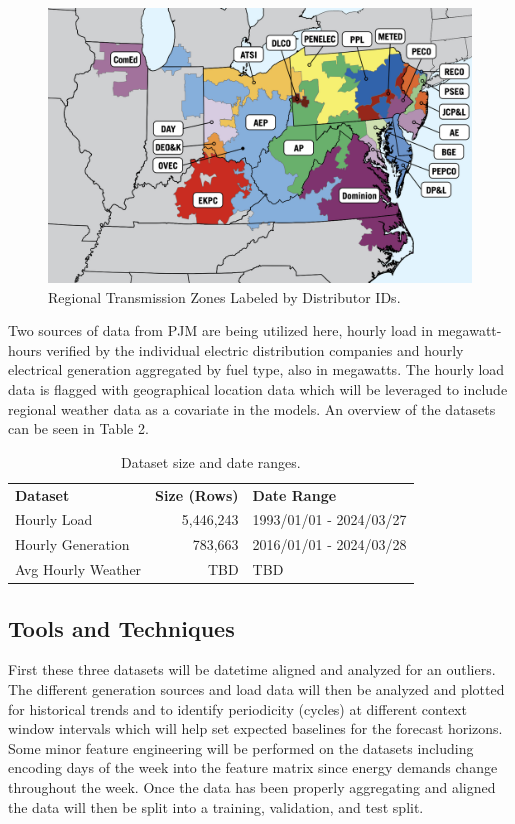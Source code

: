 \documentclass[sigconf]{acmart}
\begin{document}
  \begin{figure}[hbt!]
    \includegraphics[width=\columnwidth]{Images/Zones.png}
    \caption{Regional Transmission Zones Labeled by Distributor IDs.\protect \cite{PJM24}}
    \Description{}
    \label{fig:zone}
  \end{figure}
  
  Two sources of data from PJM are being utilized here, hourly load in megawatt-hours verified by the individual electric distribution companies and hourly electrical generation aggregated by fuel type, also in megawatts.\cite{PJMLoad24} The hourly load data is flagged with geographical location data which will be leveraged to include regional weather data as a covariate in the models. An overview of the datasets can be seen in Table 2.
  
\begin{table}[hbt!]
\centering
\caption{Dataset size and date ranges.}
\begin{tabular}{lrl}
\toprule
\textbf{Dataset} & \hfil \textbf{Size (Rows)} & \textbf{Date Range} \\
\cmidrule(rl){1-1}\cmidrule(rl){2-2}\cmidrule(rl){3-3}
  Hourly Load & 5,446,243 & 1993/01/01 - 2024/03/27 \\
  Hourly Generation & 783,663 & 2016/01/01 - 2024/03/28 \\   
  Avg Hourly Weather & TBD & TBD  \\   
  \bottomrule
\end{tabular}
\end{table}

  \subsection{Tools and Techniques}
  First these three datasets will be datetime aligned and analyzed for an outliers. The different generation sources and load data will then be analyzed and plotted for historical trends and to identify periodicity (cycles) at different context window intervals which will help set expected baselines for the forecast horizons. Some minor feature engineering will be performed on the datasets including encoding days of the week into the feature matrix since energy demands change throughout the week. Once the data has been properly aggregating and aligned the data will then be split into a training, validation, and test split.
\end{document}
